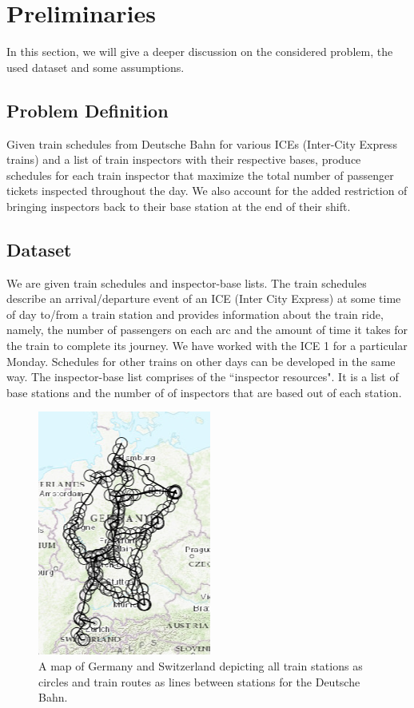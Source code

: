 \documentclass[11pt]{article}
\begin{document}
\section{Preliminaries}

In this section, we will give a deeper discussion on the considered problem, the used 
dataset and some assumptions.

\subsection{Problem Definition}

\par Given train schedules from Deutsche Bahn for various ICEs (Inter-City Express trains) and a list of train inspectors with their respective bases, produce schedules for each train inspector that maximize the total number of passenger tickets inspected throughout the day. We also account for the added restriction of bringing inspectors back to their base station at the end of their shift.

\subsection{Dataset}
\par We are given train schedules and inspector-base lists. The train schedules describe an arrival/departure event of an ICE (Inter City Express) at some time of day to/from a train station and provides information about the train ride, namely, the number of passengers on each arc and the amount of time it takes for the train to complete its journey. We have worked with the ICE 1 for a particular Monday. Schedules for other trains on other days can be developed in the same way. The inspector-base list comprises of the ``inspector resources". It is a list of base stations and the number of of inspectors that are based out of each station.

\begin{figure}[t]
    \centering
    \includegraphics[scale=0.7]{pics/GermanyTrainMap.png}
    \caption{A map of Germany and Switzerland depicting all train stations as circles and train routes as lines between stations for the Deutsche Bahn.}
    \label{fig:map}
\end{figure}
\end{document}
